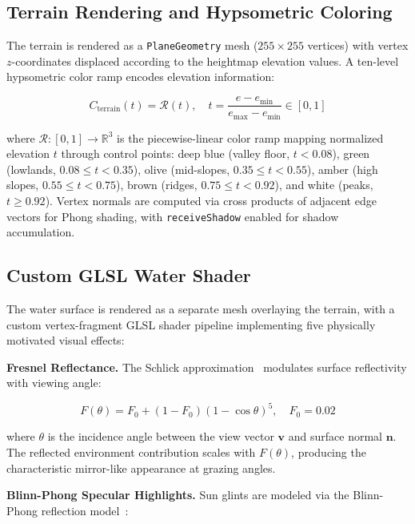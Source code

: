 \documentclass[11pt, a4paper]{article}
\newcommand{\R}{\mathbb{R}}
\newcommand{\vect}[1]{\boldsymbol{#1}}
\begin{document}
\subsection{Terrain Rendering and Hypsometric Coloring}

The terrain is rendered as a \texttt{PlaneGeometry} mesh ($255 \times 255$ vertices) with vertex $z$-coordinates displaced according to the heightmap elevation values. A ten-level hypsometric color ramp encodes elevation information:

\begin{equation}
  C_{\text{terrain}}(t) = \mathcal{R}(t), \quad t = \frac{e - e_{\min}}{e_{\max} - e_{\min}} \in [0,1]
  \label{eq:hypso}
\end{equation}

\noindent where $\mathcal{R}: [0,1] \to \R^3$ is the piecewise-linear color ramp mapping normalized elevation $t$ through control points: deep blue (valley floor, $t < 0.08$), green (lowlands, $0.08 \leq t < 0.35$), olive (mid-slopes, $0.35 \leq t < 0.55$), amber (high slopes, $0.55 \leq t < 0.75$), brown (ridges, $0.75 \leq t < 0.92$), and white (peaks, $t \geq 0.92$). Vertex normals are computed via cross products of adjacent edge vectors for Phong shading, with \texttt{receiveShadow} enabled for shadow accumulation.

\subsection{Custom GLSL Water Shader}

The water surface is rendered as a separate mesh overlaying the terrain, with a custom vertex-fragment GLSL shader pipeline implementing five physically motivated visual effects:

\textbf{Fresnel Reflectance.} The Schlick approximation~\cite{fresnel} modulates surface reflectivity with viewing angle:

\begin{equation}
  F(\theta) = F_0 + (1 - F_0)(1 - \cos\theta)^5, \quad F_0 = 0.02
  \label{eq:fresnel}
\end{equation}

\noindent where $\theta$ is the incidence angle between the view vector $\vect{v}$ and surface normal $\vect{n}$. The reflected environment contribution scales with $F(\theta)$, producing the characteristic mirror-like appearance at grazing angles.

\textbf{Blinn-Phong Specular Highlights.} Sun glints are modeled via the Blinn-Phong reflection model~\cite{phong}:
\end{document}
